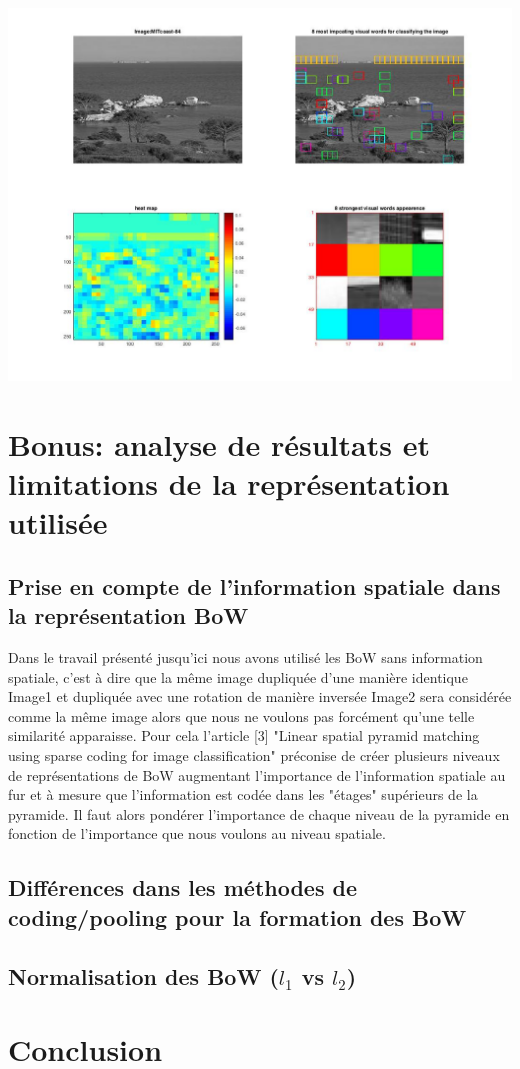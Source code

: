 \documentclass[a4paper]{article}
\begin{document}
\begin{center}
\includegraphics[scale=0.3]{heatMap}
\end{center}




\section{Bonus: analyse de résultats et limitations de la représentation utilisée}
\subsection{Prise en compte de l'information spatiale dans la représentation BoW}
Dans le travail présenté jusqu'ici nous avons utilisé les BoW sans information spatiale, c'est à dire que la même image dupliquée d'une manière identique Image1 et dupliquée avec une rotation de manière inversée Image2 sera considérée comme la même image alors que nous ne voulons pas forcément qu'une telle similarité apparaisse. Pour cela l'article [3] "Linear spatial pyramid matching using sparse coding for image classification" préconise de créer plusieurs niveaux de représentations de BoW augmentant l'importance de l'information spatiale au fur et à mesure que l'information est codée dans les "étages" supérieurs de la pyramide. Il faut alors pondérer l'importance de chaque niveau de la pyramide en fonction de l'importance que nous voulons au niveau spatiale. 
\subsection{Différences dans les méthodes de coding/pooling pour la formation des BoW}

\subsection{Normalisation des BoW ($l_1$ vs  $l_2$)}
\section{Conclusion}
\end{document}
